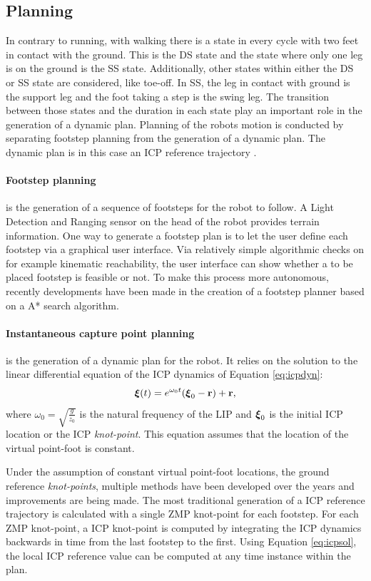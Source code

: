 \subsection{Planning}
In contrary to running, with walking there is a state in every cycle with two feet in contact with the ground. This is the \ac{DS} state and the state where only one leg is on the ground is the \ac{SS} state. Additionally, other states within either the \ac{DS} or \ac{SS} state are considered, like toe-off. In \ac{SS}, the leg in contact with ground is the support leg and the foot taking a step is the swing leg. The transition between those states and the duration in each state play an important role in the generation of a dynamic plan. Planning of the robots motion is conducted by separating footstep planning from the generation of a dynamic plan. The dynamic plan is in this case an \ac{ICP} reference trajectory \cite{seyde2018inclusion}.
\paragraph{Footstep planning} is the generation of a sequence of footsteps for the robot to follow. A Light Detection and Ranging sensor on the head of the robot provides terrain information. One way to generate a footstep plan is to let the user define each footstep via a graphical user interface. Via relatively simple algorithmic checks on for example kinematic reachability, the user interface can show whether a to be placed footstep is feasible or not. To make this process more autonomous, recently developments have been made in the creation of a footstep planner based on a A* search algorithm. 
\paragraph{Instantaneous capture point planning}\label{subsec:icpplan} is the generation of a dynamic plan for the robot. It relies on the solution to the linear differential equation of the \ac{ICP} dynamics of Equation \ref{eq:icpdyn}:
\begin{equation}\label{eq:icpsol}
	\boldsymbol{\xi}(t)=e^{\omega_0t}(\boldsymbol{\xi}_0- \mathbf{r}) + \mathbf{r},
\end{equation}
where $\omega_0=\sqrt{\frac{g}{z_0}}$ is the natural frequency of the \ac{LIP} and $\boldsymbol{\xi}_0$ is the initial \ac{ICP} location or the \ac{ICP} \textit{knot-point}. This equation assumes that the location of the virtual point-foot is constant. 

Under the assumption of constant virtual point-foot locations, the ground reference \textit{knot-points}, multiple methods have been developed over the years and improvements are being made. The most traditional generation of a \ac{ICP} reference trajectory is calculated with a single \ac{ZMP} knot-point \cite{englsberger2012integration} for each footstep. For each \ac{ZMP} knot-point, a \ac{ICP} knot-point is computed by integrating the \ac{ICP} dynamics backwards in time from the last footstep to the first. Using Equation \ref{eq:icpsol}, the local \ac{ICP} reference value can be computed at any time instance within the plan. 

